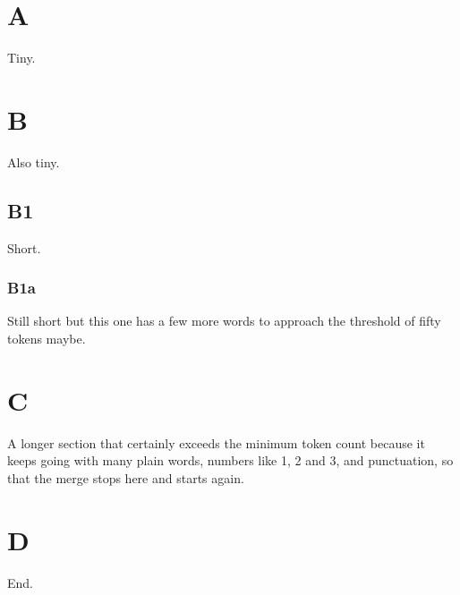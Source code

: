 \documentclass{article}
\begin{document}
\section{A}
Tiny.
\section{B}
Also tiny.
\subsection{B1}
Short.
\subsubsection{B1a}
Still short but this one has a few more words to approach the threshold of fifty tokens maybe.
\section*{C}
A longer section that certainly exceeds the minimum token count because it keeps going with many plain words, numbers like 1, 2 and 3, and punctuation, so that the merge stops here and starts again.
\section{D}
End.
\end{document}
